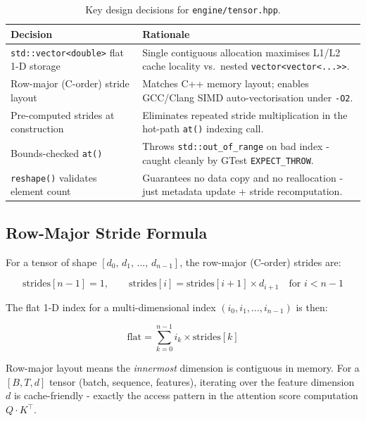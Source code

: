 \documentclass[12pt, a4paper]{article}
\begin{document}
\begin{table}[!ht]
\centering
\renewcommand{\arraystretch}{1.35}
\begin{tabularx}{\textwidth}{@{} l L @{}}
\toprule
\textbf{Decision} & \textbf{Rationale} \\
\midrule
\texttt{std::vector<double>} flat 1-D storage
  & Single contiguous allocation maximises L1/L2 cache locality vs.\ nested
    \texttt{vector<vector<...>>}. \\
Row-major (C-order) stride layout
  & Matches C++ memory layout; enables GCC/Clang SIMD auto-vectorisation
    under \texttt{-O2}. \\
Pre-computed strides at construction
  & Eliminates repeated stride multiplication in the hot-path \texttt{at()} 
    indexing call. \\
Bounds-checked \texttt{at()}
  & Throws \texttt{std::out\_of\_range} on bad index - caught cleanly by GTest
    \texttt{EXPECT\_THROW}. \\
\texttt{reshape()} validates element count
  & Guarantees no data copy and no reallocation - just metadata update + stride
    recomputation. \\
\bottomrule
\end{tabularx}
\caption{Key design decisions for \texttt{engine/tensor.hpp}.}
\end{table}

\subsection{Row-Major Stride Formula}

For a tensor of shape \([d_0,\, d_1,\, \ldots,\, d_{n-1}]\), the row-major
(C-order) strides are:

\[
  \text{strides}[n-1] = 1, \qquad
  \text{strides}[i] = \text{strides}[i+1] \times d_{i+1}
  \quad \text{for } i < n-1
\]

The flat 1-D index for a multi-dimensional index
\((i_0, i_1, \ldots, i_{n-1})\) is then:

\[
  \text{flat} = \sum_{k=0}^{n-1} i_k \times \text{strides}[k]
\]

\begin{tcolorbox}[interviewbox, title={Interview Talking Point}]
  Row-major layout means the \emph{innermost} dimension is contiguous in
  memory.  For a \([B, T, d]\) tensor (batch, sequence, features), iterating
  over the feature dimension \(d\) is cache-friendly - exactly the access
  pattern in the attention score computation \(Q \cdot K^{\top}\).
\end{tcolorbox}
\end{document}
